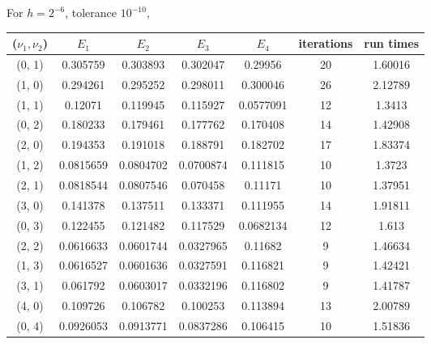 \documentclass[12pt]{article}
\begin{document}
For $h=2^{-6}$, tolerance $10^{-10}$,
\begin{center}
\begin{tabular}{||c|cccc|c|c||}
\hline \hline
 ($\nu_1, \nu_2$)   & $E_1$ & $E_2$ &  $E_3$ & $E_4$ &   iterations & run times \\
\hline \hline
   \color{red}(0, 1)   &    \color{red}0.305759  &   \color{red}0.303893  &   \color{red}0.302047  &   \color{red}0.29956   &   \color{red}20 & \color{red}1.60016 \\
 (1, 0)   &  0.294261  &      0.295252  &      0.298011  &      0.300046  &           26 & 2.12789\\ \hline
   \color{red}(1, 1)   &   \color{red}0.12071   & \color{red}0.119945  & \color{red}0.115927  & \color{red}0.0577091 & \color{red}12 & \color{red}1.3413\\
 (0, 2)   &  0.180233  &      0.179461  &      0.177762  &      0.170408  &           14  & 1.42908 \\
 (2, 0)   &  0.194353  &      0.191018  &      0.188791  &      0.182702  &           17 & 1.83374 \\ \hline
 \color{red}(1, 2)   & \color{red}0.0815659 & \color{red}0.0804702 & \color{red}0.0700874 &      0.111815  & \color{red}10 & \color{red}1.3723 \\
 \color{red}(2, 1)   &  0.0818544 &      0.0807546 &      0.070458  & \color{red}0.11171   & \color{red}10 & 1.37951 \\
 (3, 0)   &  0.141378  &      0.137511  &      0.133371  &      0.111955  &           14 & 1.91811 \\
 (0, 3)   &  0.122455  &      0.121482  &      0.117529  &      0.0682134 &           12  & 1.613 \\ \hline
 \color{red}(2, 2)   &  0.0616633 &      0.0601744 &      0.0327965 &      0.11682   &  \color{red}9 & 1.46634\\
 \color{red}(1, 3)   &  0.0616527 &      0.0601636 &      0.0327591 &      0.116821  &  \color{red}9 & 1.42421\\
 \color{red}(3, 1)   &  0.061792  &      0.0603017 &      0.0332196 &      0.116802  &  \color{red}9 & \color{red}1.41787 \\
 (4, 0)   &  0.109726  &      0.106782  &      0.100253  &      0.113894  &           13 & 2.00789\\
 (0, 4)   &  0.0926053 &      0.0913771 &      0.0837286 &      0.106415  &           10 & 1.51836\\
\hline \hline
\end{tabular}
\end{center}
\end{document}
